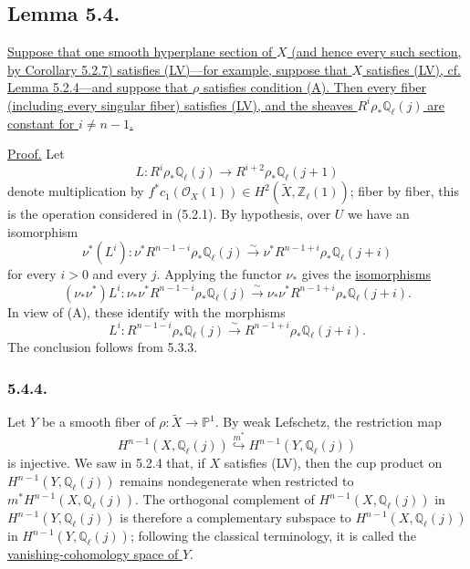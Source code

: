 \subsection*{Lemma 5.4.}
\underline{Suppose that one smooth hyperplane section of $X$ (and hence
every such section, by Corollary 5.2.7) satisfies (LV)---for example, suppose
that $X$ satisfies (LV), cf. Lemma 5.2.4---and suppose that $\rho$ satisfies
condition (A).  Then every fiber (including every singular fiber) satisfies
(LV), and the sheaves $R^i\rho_*\mathbb Q_\ell(j)$ are constant for
$i\neq n-1$.}

\underline{Proof.}
Let
\[
L:R^i\rho_*\mathbb Q_\ell(j)
\longrightarrow R^{i+2}\rho_*\mathbb Q_\ell(j+1)
\]
denote multiplication by
$f^*c_1(\mathcal O_X(1))\in
H^2(\widetilde X,\mathbb Z_\ell(1))$; fiber by fiber, this is the operation
considered in (5.2.1).  By hypothesis, over $U$ we have an isomorphism
\begin{equation}\tag{5.4.1}
\nu^*(L^i):
\nu^*R^{n-1-i}\rho_*\mathbb Q_\ell(j)
\overset{\sim}{\longrightarrow}
\nu^*R^{n-1+i}\rho_*\mathbb Q_\ell(j+i)
\end{equation}
for every $i>0$ and every $j$.  Applying the functor $\nu_*$ gives the
\underline{isomorphisms}
\begin{equation}\tag{5.4.2}
(\nu_*\nu^*)L^i:
\nu_*\nu^*R^{n-1-i}\rho_*\mathbb Q_\ell(j)
\overset{\sim}{\longrightarrow}
\nu_*\nu^*R^{n-1+i}\rho_*\mathbb Q_\ell(j+i).
\end{equation}
In view of (A), these identify with the morphisms
\begin{equation}\tag{5.4.3}
L^i:R^{n-1-i}\rho_*\mathbb Q_\ell(j)
\overset{\sim}{\longrightarrow}
R^{n-1+i}\rho_*\mathbb Q_\ell(j+i).
\end{equation}
The conclusion follows from 5.3.3.

\subsubsection*{5.4.4.}
Let $Y$ be a smooth fiber of
$\rho:\widetilde X\to\mathbb P^1$.  By weak Lefschetz, the restriction map
\[
H^{n-1}(X,\mathbb Q_\ell(j))
\overset{m^*}{\hookrightarrow}
H^{n-1}(Y,\mathbb Q_\ell(j))
\]
is injective.  We saw in 5.2.4 that, if $X$ satisfies (LV), then the cup
product on $H^{n-1}(Y,\mathbb Q_\ell(j))$ remains nondegenerate when
restricted to $m^*H^{n-1}(X,\mathbb Q_\ell(j))$.  The orthogonal complement
of $H^{n-1}(X,\mathbb Q_\ell(j))$ in
$H^{n-1}(Y,\mathbb Q_\ell(j))$ is therefore a complementary subspace to
$H^{n-1}(X,\mathbb Q_\ell(j))$ in
$H^{n-1}(Y,\mathbb Q_\ell(j))$; following the classical terminology, it is
called the \underline{vanishing-cohomology space of $Y$}.


